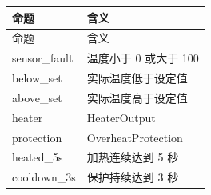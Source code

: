 \begin{longtable}{L{3.3cm}L{10.0cm}}

\toprule

命题 & 含义\\

\midrule

\endfirsthead

\toprule

命题 & 含义\\

\midrule

\endhead

{\ttfamily sensor\_fault} & 温度小于 0 或大于 100\\

{\ttfamily below\_set} & 实际温度低于设定值\\

{\ttfamily above\_set} & 实际温度高于设定值\\

{\ttfamily heater} & HeaterOutput\\

{\ttfamily protection} & OverheatProtection\\

{\ttfamily heated\_5s} & 加热连续达到 5 秒\\

{\ttfamily cooldown\_3s} & 保护持续达到 3 秒\\

\bottomrule

\end{longtable}

